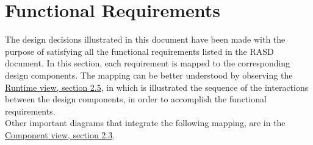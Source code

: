 \section{Functional Requirements}
The design decisions illustrated in this document have been made with the purpose of satisfying all the functional requirements listed in the RASD document. In this section, each requirement is mapped to the corresponding design components.
The mapping can be better understood by observing the \hyperlink{RV}{\underline{Runtime view, section 2.5}}, in which is illustrated the sequence of the interactions between the design components, in order to accomplish the functional requirements.\\
Other important diagrams that integrate the following mapping, are in the\\ \hyperlink{CV}{\underline{Component view, section 2.3}}.

